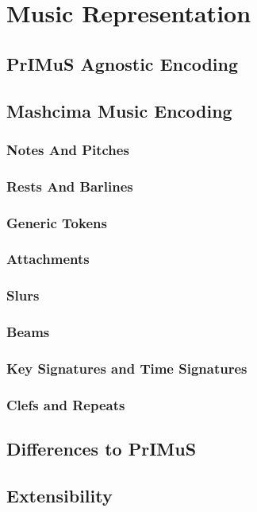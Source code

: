 \chapter{Music Representation}
\label{chap:MusicRepresentation}

\section{PrIMuS Agnostic Encoding}

\section{Mashcima Music Encoding}

\subsection{Notes And Pitches}

\subsection{Rests And Barlines}

\subsection{Generic Tokens}

\subsection{Attachments}
\label{sec:Attachments}

\subsection{Slurs}

\subsection{Beams}

\subsection{Key Signatures and Time Signatures}

\subsection{Clefs and Repeats}

\section{Differences to PrIMuS}

\section{Extensibility}
